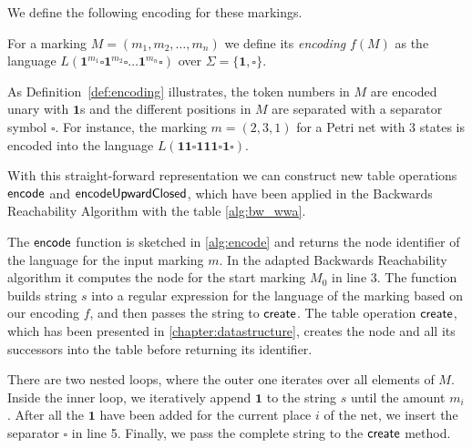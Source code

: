 \par 

We define the following encoding for these markings.

\begin{definition}\label{def:encoding}
For a marking $M = (m_{1},m_{2},\dots,m_{n})$ we define its \emph{encoding} $f(M)$ as the language $L(\bm{1}^{m_{1}} \square \bm{1}^{m_{2}} \square \ldots \bm{1}^{m_{n}} \square)$ over $\Sigma = \{\bm{1}, \square\}$.
\end{definition}


As Definition~\autoref{def:encoding} illustrates, the token numbers in $M$ are encoded unary with $\bm{1}$s and the different positions in $M$ are separated with a separator symbol $\square$. For instance, the marking $m = (2,3,1)$ for a Petri net with 3 states is encoded into the language $L(\bm{11 \square 111 \square 1 \square})$. 
\par 
With this straight-forward representation we can construct new table operations $\operatorname{\textsf{encode}}$ and $\operatorname{\textsf{encodeUpwardClosed}}$, which have been applied in the Backwards Reachability Algorithm with the table \autoref{alg:bw_wwa}. 
\par
The $\operatorname{\textsf{encode}}$ function is sketched in \autoref{alg:encode} and returns the node identifier of the language for the input marking $m$. In the adapted Backwards Reachability algorithm it computes the node for the start marking $M_{0}$ in line 3. The function builds string $s$ into a regular expression for the language of the marking based on our encoding $f$, and then passes the string to $\operatorname{\textsf{create}}$. The table operation $\operatorname{\textsf{create}}$, which has been presented in \autoref{chapter:datastructure}, creates the node and all its successors into the table before returning its identifier.

\par
There are two nested loops, where the outer one iterates over all elements of $M$. Inside the inner loop, we iteratively append $\bm{1}$ to the string $s$ until the amount $m_{i}$. After all the $\bm{1}$ have been added for the current place $i$ of the net, we insert the separator $\square$ in line 5.
Finally, we pass the complete string to the $\operatorname{\textsf{create}}$ method. 

